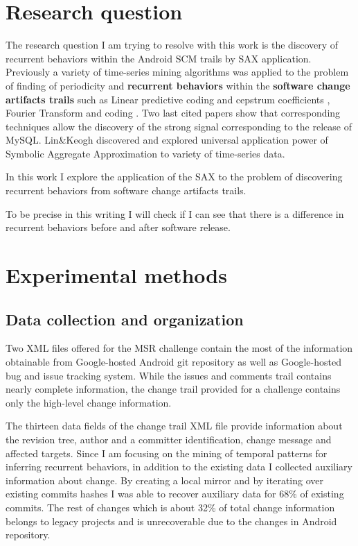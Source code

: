 \documentclass[10pt, conference, compsocconf]{IEEEtran}
\begin{document}
\section{Research question}
The research question I am trying to resolve with this work is the discovery of recurrent behaviors within the Android SCM
trails by SAX application. Previously a variety of time-series mining algorithms was applied to the problem of finding
of periodicity and \textbf{recurrent behaviors} within the \textbf{software change artifacts trails} such as Linear predictive
coding and cepstrum coefficients \cite{citeulike:3378725}, Fourier Transform \cite{citeulike:10377345}
and coding \cite{citeulike:10377366}. Two last cited papers show that corresponding techniques allow the discovery of the 
strong signal corresponding to the release of MySQL.
Lin\&Keogh \cite{citeulike:2821475} discovered and explored universal application power 
of Symbolic Aggregate Approximation to variety of time-series data. 

In this work I explore the application of the SAX to the problem of discovering recurrent behaviors from software change 
artifacts trails.

To be precise in this writing I will check if I can see that there is a difference in recurrent behaviors before and after 
software release.

\section{Experimental methods}
\subsection{Data collection and organization}
Two XML files offered for the MSR challenge contain the most of the information obtainable 
from Google-hosted Android git repository as well as Google-hosted bug and issue tracking system.
While the issues and comments trail contains nearly complete information, the change trail 
provided for a challenge contains only the high-level change information. 

The thirteen data fields of the change trail XML file provide information about the revision 
tree, author and a committer identification, change message and affected targets. 
Since I am focusing on the mining of temporal patterns for inferring recurrent behaviors, 
in addition to the existing data I collected auxiliary information about change. By creating
a local mirror and by iterating over existing commits hashes I was able to recover auxiliary 
data for 68\% of existing commits. The rest of changes which is about 32\% of total change 
information belongs to legacy projects and is unrecoverable due to the changes in Android repository. 
\end{document}
